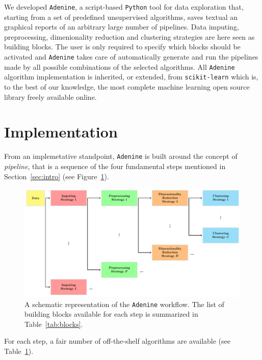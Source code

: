 \documentclass[twoside,11pt]{article}
\makeatletter
\newcommand{\ade}{\texttt{Adenine}\@\xspace}
\newcommand{\py}{\texttt{Python}\@\xspace}
\makeatother
\begin{document}
We developed \ade, a script-based \py tool for data exploration that, starting from a set of predefined unsupervised algorithms, saves textual an graphical reports of an arbitrary large number of pipelines. Data imputing, preprocessing, dimenionality reduction and clustering strategies are here seen as building blocks. The user is only required to specify which blocks should be activated and \ade takes care of automatically generate and run the pipelines made by all possible combinations of the selected algorithms. All \ade algorithm implementation is inherited, or extended, from \texttt{scikit-learn} \citep{scikit-learn} which is, to the best of our knowledge, the most complete machine learning open source library freely available online.

\section{Implementation}\label{sec:implem}
From an implemetative standpoint, \ade is built around the concept of \emph{pipeline}, that is a sequence of the four fundamental steps mentioned in Section~\ref{sec:intro} (see Figure~\ref{fig:workflow}).

\begin{figure}[h!]
    \centering
    \includegraphics[width=\textwidth]{ade_wf/ade_wf.pdf}
    \caption{A schematic representation of the \ade workflow. The list of building blocks available for each step is summarized in Table~\ref{tab:blocks}.}\label{fig:workflow}
\end{figure}

For each step, a fair number of off-the-shelf algorithms are available (see Table~\ref{sec:implem}).

\end{document}
